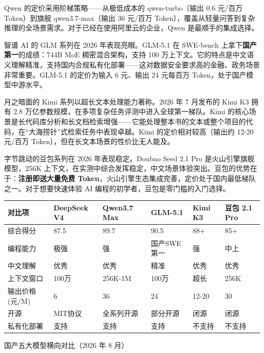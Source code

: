 Qwen 的定价采用阶梯策略——从极低成本的 qwen-turbo（输出 0.6 元/百万 Token）到旗舰 qwen3.7-max（输出 36 元/百万 Token），覆盖从轻量问答到复杂推理的全场景需求。对于已经在使用阿里云的企业，Qwen 是最顺手的集成选择。


智谱 AI 的 GLM 系列在 2026 年表现亮眼。GLM-5.1 在 SWE-bench 上拿下\textbf{国产第一}的成绩：744B MoE 稠密混合架构，支持 100 万上下文。它的特点是中文语义理解精准，支持国内合规私有化部署——这对数据安全要求高的金融、政务场景非常重要。GLM-5.1 的定价为输入 6 元、输出 24 元每百万 Token，处于国产模型中游水平。


月之暗面的 Kimi 系列以超长文本处理能力著称。2026 年 7 月发布的 Kimi K3 拥有 2.8 万亿参数规模，在多项复杂任务评测中进入全球第一梯队。Kimi 的核心场景是长代码库分析和长文档检索增强——它能处理整本书的文本或整个项目的代码，在“大海捞针”式检索任务中表现卓越。Kimi 的定价相对较高（输出约 12-20 元/百万 Token），但在长文本场景的性价比无人能及。


字节跳动的豆包系列在 2026 年表现稳定。Doubao Seed 2.1 Pro 是火山引擎旗舰模型，256K 上下文，在实测中综合发挥稳定，中文场景体验突出。豆包的优势在于：\textbf{注册即送大量免费 Token}，火山引擎生态集成完善，定价处于国内最低梯队之一。对于想要快速体验 AI 编程的初学者，豆包是零门槛的入门选择。

\begin{center}
\begin{tabularx}{\linewidth}{|X|X|X|X|X|X|}
\hline
\textbf{对比项} & \textbf{DeepSeek V4} & \textbf{Qwen3.7 Max} & \textbf{GLM-5.1} & \textbf{Kimi K3} & \textbf{豆包 2.1 Pro} \tabularnewline
\hline
综合得分 & 87.5 & 89.7 & 90.5 & 88+ & 85+ \tabularnewline
编程能力 & 极强 & 强 & 国产SWE第一 & 强 & 中上 \tabularnewline
中文理解 & 优秀 & 优秀 & 精准 & 优秀 & 优秀 \tabularnewline
上下文窗口 & 100万 & 256K-1M & 100万 & 超长 & 256K \tabularnewline
输出价格(元/M) & 6 & 36 & 24 & 12-20 & 30 \tabularnewline
开源 & MIT协议 & 全系列开源 & 部分开源 & 闭源 & 闭源 \tabularnewline
私有化部署 & 支持 & 支持 & 支持 & 不支持 & 不支持 \tabularnewline
\hline
\end{tabularx}
\end{center}

\begin{center}\small\color{gray}国产五大模型横向对比（2026 年 8 月）\end{center}

